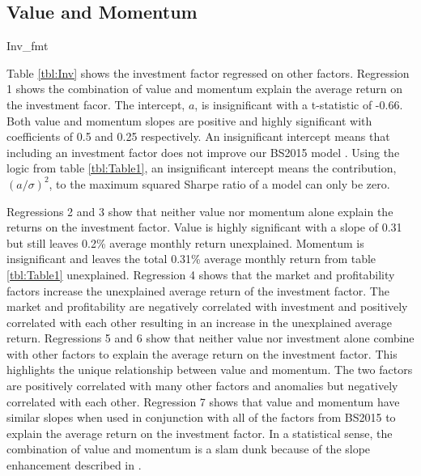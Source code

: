 
\subsection{Value and Momentum}

{Inv_fmt}

Table \ref{tbl:Inv} shows the investment factor regressed on other factors. Regression 1
shows the combination of value and momentum explain the average return on the investment
facor. The intercept, $a$, is insignificant with a t-statistic of -0.66. Both value and
momentum slopes are positive and highly significant with coefficients of 0.5 and 0.25
respectively. An insignificant intercept means that including an investment factor does
not improve our BS2015 model \parencite{fama1998determining, barillas2016alpha,
fama2016choosing}. Using the logic from table \ref{tbl:Table1}, an insignificant intercept
means the contribution, $(a/\sigma)^2$, to the maximum squared Sharpe ratio of a model can
only be zero.

Regressions 2 and 3 show that neither value nor momentum alone explain the returns on the
investment factor. Value is highly significant with a slope of 0.31 but still leaves 0.2\%
average monthly return unexplained. Momentum is insignificant and leaves the total 0.31\%
average monthly return from table \ref{tbl:Table1} unexplained. Regression 4 shows that
the market and profitability factors increase the unexplained average return of the
investment factor. The market and profitability are negatively correlated with investment
and positively correlated with each other resulting in an increase in the unexplained
average return. Regressions 5 and 6 show that neither value nor investment alone combine
with other factors to explain the average return on the investment factor. This highlights
the unique relationship between value and momentum. The two factors are positively
correlated with many other factors and anomalies but negatively correlated with each
other. Regression 7 shows that value and momentum have similar slopes when used in
conjunction with all of the factors from BS2015 to explain the average return on the
investment factor. In a statistical sense, the combination of value and momentum is a slam
dunk because of the slope enhancement described in \textcite{fama2015incremental}.

